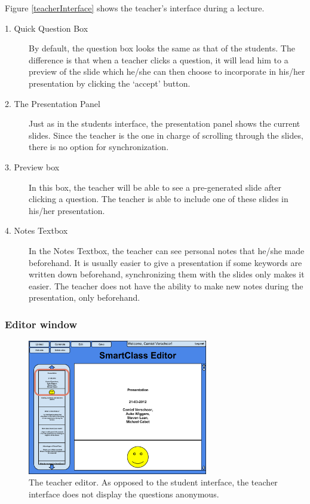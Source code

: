 \documentclass[11pt]{article}
\begin{document}
Figure \ref{teacherInterface} shows the teacher's interface during a lecture.
\begin{description}
\item[1. Quick Question Box] By default, the question box looks the same as that of the students. The difference is that when a teacher clicks a question, it will lead him to a preview of the slide which he/she can then choose to incorporate in his/her presentation by clicking the `accept' button. 
\item[2. The Presentation Panel] Just as in the students interface, the presentation panel shows the current slides. Since the teacher is the one in charge of scrolling through the slides, there is no option for synchronization. 
\item[3. Preview box] In this box, the teacher will be able to see a pre-generated slide after clicking a question. The teacher is able to include one of these slides in his/her presentation. 
\item[4. Notes Textbox] In the Notes Textbox, the teacher can see personal notes that he/she made beforehand. It is usually easier to give a presentation if some keywords are written down beforehand, synchronizing them with the slides only makes it easier. The teacher does not have the ability to make new notes during the presentation, only beforehand.
\end{description}
\subsubsection{Editor window}

\begin{figure}[!h]
\centering
\includegraphics[width=0.7\textwidth]{teacherInterfaceEditor.pdf}
\caption{The teacher editor. As opposed to the student interface, the teacher interface does not display the questions anonymous.}
\label{teacherInterfaceEditor}
\end{figure}
\end{document}
